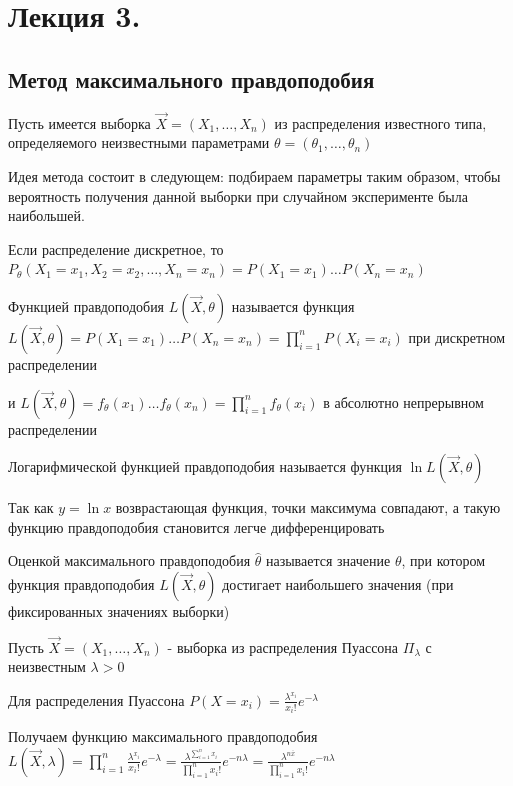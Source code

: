 \documentclass[12pt]{article}
\begin{document}






\section{Лекция 3.}

\subsection{Метод максимального правдоподобия}

Пусть имеется выборка $\vec{X} = (X_1, \dots, X_n)$ из распределения известного типа, определяемого неизвестными параметрами 
$\theta = (\theta_1, \dots, \theta_n)$

Идея метода состоит в следующем: подбираем параметры таким образом, чтобы вероятность получения
данной выборки при случайном эксперименте была наибольшей.

Если распределение дискретное, то $P_{\theta} (X_1 = x_1, X_2 = x_2, \dots, X_n = x_n) = P(X_1 = x_1) \dots P(X_n = x_n)$

\Def Функцией правдоподобия $L(\vec{X}, \theta)$ называется функция $L(\vec{X}, \theta) = P(X_1 = x_1) \dots P(X_n = x_n) = \prod_{i = 1}^n P(X_i = x_i)$ при дискретном распределении

и $L(\vec{X}, \theta) = f_\theta(x_1) \dots f_\theta(x_n) = \prod_{i = 1}^n f_\theta(x_i)$ в абсолютно непрерывном распределении

\Def Логарифмической функцией правдоподобия называется функция $\ln L(\vec{X}, \theta)$

\Nota Так как $y = \ln x$ возврастающая функция, точки максимума совпадают, а такую функцию правдоподобия становится легче дифференцировать

\Def Оценкой максимального правдоподобия $\hat{\theta}$ называется значение $\theta$, при котором функция правдоподобия 
$L(\vec{X}, \theta)$ достигает наибольшего значения (при фиксированных значениях выборки)

 Пусть $\vec{X} = (X_1, \dots, X_n)$ - выборка из распределения Пуассона $\Pi_\lambda$ с неизвестным $\lambda > 0$

\Mem Для распределения Пуассона $P(X = x_i) = \frac{\lambda^{x_i}}{x_i!} e^{-\lambda}$

Получаем функцию максимального правдоподобия $L(\vec{X}, \lambda) = \prod_{i = 1}^n \frac{\lambda^{x_i}}{x_i!} e^{-\lambda} = 
\frac{\lambda^{\sum_{i = 1}^n x_i}}{\prod_{i = 1}^n x_i!} e^{-n\lambda} = \frac{\lambda^{n \overline{x}}}{\prod_{i = 1}^n x_i!} e^{-n\lambda}$
\end{document}
